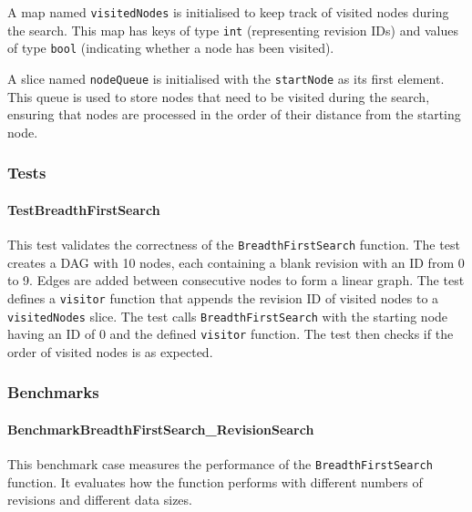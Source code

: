 A map named \lstinline{visitedNodes} is initialised to keep track of visited nodes during the search. This map has keys of type \lstinline{int} (representing revision IDs) and values of type \lstinline{bool} (indicating whether a node has been visited).
\smallskip

A slice named \lstinline{nodeQueue} is initialised with the \lstinline{startNode} as its first element. This queue is used to store nodes that need to be visited during the search, ensuring that nodes are processed in the order of their distance from the starting node.

\subsubsection*{Tests}

\paragraph{TestBreadthFirstSearch}
This test validates the correctness of the \lstinline{BreadthFirstSearch} function. The test creates a DAG with 10 nodes, each containing a blank revision with an ID from 0 to 9. Edges are added between consecutive nodes to form a linear graph. The test defines a \lstinline{visitor} function that appends the revision ID of visited nodes to a \lstinline{visitedNodes} slice. The test calls \lstinline{BreadthFirstSearch} with the starting node having an ID of 0 and the defined \lstinline{visitor} function. The test then checks if the order of visited nodes is as expected.

\subsubsection*{Benchmarks}

\paragraph{BenchmarkBreadthFirstSearch\_RevisionSearch}
This benchmark case measures the performance of the \lstinline{BreadthFirstSearch} function. It evaluates how the function performs with different numbers of revisions and different data sizes.

